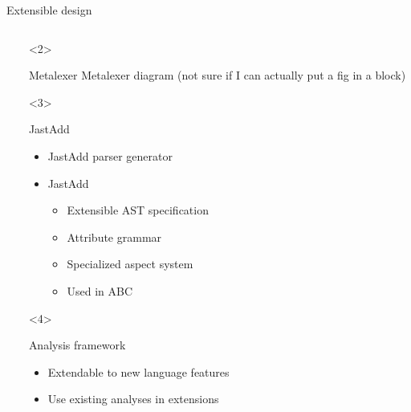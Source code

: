 \begin{frame}{Extensible design}
  \begin{columns}
    \begin{column}{5cm}
    \end{column}
    \begin{column}{5cm}
      \begin{onlyenv}<2>
        \begin{block}{Metalexer}
          Metalexer diagram (not sure if I can actually put a fig in a block)
        \end{block}
      \end{onlyenv}
      \begin{onlyenv}<3>
        \begin{block}{JastAdd}
          \begin{itemize}
          \item JastAdd parser generator
          \item JastAdd 
            \begin{itemize}
            \item Extensible AST specification
            \item Attribute grammar
            \item Specialized aspect system
            \item Used in ABC
            \end{itemize}
          \end{itemize}
        \end{block}
      \end{onlyenv}
      \begin{onlyenv}<4>
        \begin{block}{Analysis framework}
          \begin{itemize}
          \item Extendable to new language features
          \item Use existing analyses in extensions
          \end{itemize}
        \end{block}
      \end{onlyenv}
    \end{column}
  \end{columns}
\end{frame}
